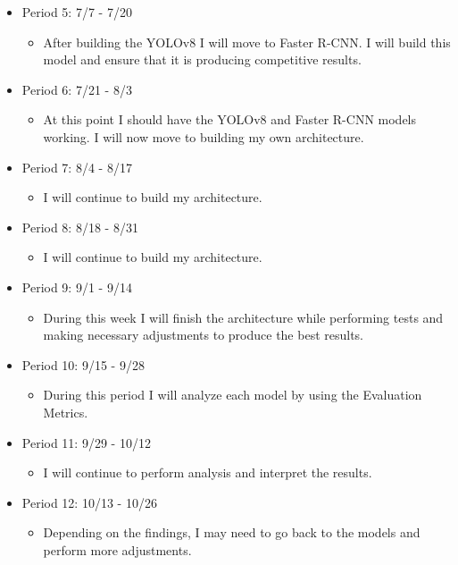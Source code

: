 \documentclass[10pt,twocolumn]{article}
\begin{document}
\begin{itemize}
    \item Period 5: 7/7 - 7/20 
    \begin{itemize}
            \item After building the YOLOv8 I will move to Faster R-CNN. I will build this model and ensure that it is producing competitive results. 
    \end{itemize}
    \item Period 6: 7/21 - 8/3
    \begin{itemize}
            \item At this point I should have the YOLOv8 and Faster R-CNN models working. I will now move to building my own architecture. 
    \end{itemize}
    \item Period 7: 8/4 - 8/17
    \begin{itemize}
            \item I will continue to build my architecture. 
    \end{itemize}
    \item Period 8: 8/18 - 8/31
    \begin{itemize}
            \item I will continue to build my architecture. 
    \end{itemize}
    \item Period 9: 9/1 - 9/14
    \begin{itemize}
            \item During this week I will finish the architecture while performing tests and making necessary adjustments to produce the best results. 
    \end{itemize}
    \item Period 10: 9/15 - 9/28
    \begin{itemize}
            \item During this period I will analyze each model by using the Evaluation Metrics. 
    \end{itemize}
    \item Period 11:  9/29 - 10/12
    \begin{itemize}
            \item I will continue to perform analysis and interpret the results. 
    \end{itemize}
    \item Period 12: 10/13 - 10/26
    \begin{itemize}
            \item Depending on the findings, I may need to go back to the models and perform more adjustments. 

\end{itemize}
\end{itemize}
\end{document}
